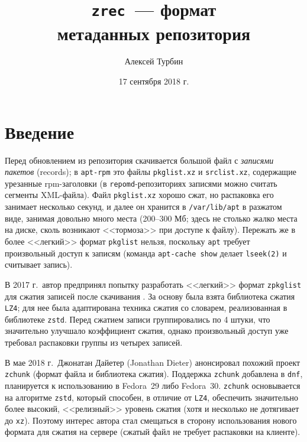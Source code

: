 \documentclass[russian,a4paper,12pt]{article}
\begin{document}
\title{\texttt{zrec}~--- формат\\метаданных репозитория}
\author{Алексей Турбин}
\date{17 сентября 2018 г.}
\maketitle

\begin{abstract}

\end{abstract}

\section{Введение}
Перед обновлением из репозитория скачивается большой файл с \textit{записями пакетов} (records);
в \verb|apt-rpm| это файлы \verb|pkglist.xz| и \verb|srclist.xz|, содержащие урезанные
rpm-заголовки (в \verb|repomd|-репозиториях записями можно считать сегменты XML-файла).
Файл \verb|pkglist.xz| хорошо сжат, но распаковка его занимает несколько секунд, и далее
он хранится в \verb|/var/lib/apt| в разжатом виде, занимая довольно много места (200--300 Мб;
здесь не столько жалко места на диске, сколь возникают <<тормоза>> при доступе к файлу).
Пережать же в более <<легкий>> формат \verb|pkglist| нельзя, поскольку \verb|apt| требует произвольный
доступ к записям (команда \texttt{apt-cache show} делает \verb|lseek(2)| и считывает запись).

В 2017 г.~автор предпринял попытку разработать <<легкий>> формат \verb|zpkglist|
для сжатия записей после скачивания \cite{zpkglist}.
За основу была взята библиотека сжатия \verb|LZ4|; для нее была адаптирована техника сжатия со словарем,
реализованная в библиотеке \verb|zstd|.  Перед сжатием записи группировались по 4 штуки, что значительно
улучшало коэффициент сжатия, однако произвольный доступ уже требовал распаковки группы из четырех записей.

В мае 2018 г.~Джонатан Дайетер (Jonathan Dieter) анонсировал похожий проект \verb|zchunk| \cite{dieter}
(формат файла и библиотека сжатия).  Поддержка \verb|zchunk| добавлена в \verb|dnf|, планируется к использованию
в Fedora~29 либо Fedora~30.  \verb|zchunk| основывается на алгоритме \verb|zstd|, который способен, в отличие от \verb|LZ4|,
обеспечить значительно более высокий, <<релизный>> уровень сжатия (хотя и несколько не дотягивает до \verb|xz|).
Поэтому интерес автора стал смещаться в сторону использования нового формата для сжатия на сервере (сжатый файл
не требует распаковки на клиенте).
\end{document}
